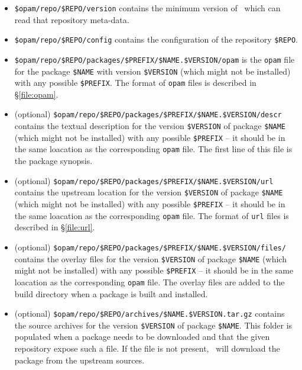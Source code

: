 \documentclass[a4paper,10pt]{article}
\begin{document}
\begin{itemize}

\item \verb+$opam/repo/$REPO/version+ contains the minimum version of
  \OPAM\ which can read that repository meta-data.

\item \verb+$opam/repo/$REPO/config+ contains the configuration
  of the repository \verb+$REPO+.

\item \verb+$opam/repo/$REPO/packages/$PREFIX/$NAME.$VERSION/opam+ is
  the {\tt opam} file for the package \verb+$NAME+ with version
  \verb+$VERSION+ (which might not be installed) with any possible
  \verb+$PREFIX+. The format of {\tt opam} files is described in
  \S\ref{file:opam}.

\item (optional) \verb+$opam/repo/$REPO/packages/$PREFIX/$NAME.$VERSION/descr+
  contains the textual description for the version \verb+$VERSION+ of
  package \verb+$NAME+ (which might not be installed) with any
  possible \verb+$PREFIX+ -- it should be in the same loacation as the
  corresponding {\tt opam} file. The first line of this file is the
  package synopsis.

\item (optional) \verb+$opam/repo/$REPO/packages/$PREFIX/$NAME.$VERSION/url+
  contains the upstream location for the version \verb+$VERSION+ of
  package \verb+$NAME+ (which might not be installed) with any
  possible \verb+$PREFIX+ -- it should be in the same loacation as the
  corresponding {\tt opam} file. The format of {\tt url} files is
  described in \S\ref{file:url}.

\item (optional) \verb+$opam/repo/$REPO/packages/$PREFIX/$NAME.$VERSION/files/+
  contains the overlay files for the version \verb+$VERSION+ of
  package \verb+$NAME+ (which might not be installed) with any
  possible \verb+$PREFIX+ -- it should be in the same loacation as the
  corresponding {\tt opam} file. The overlay files are added to the
  build directory when a package is built and installed.

\item (optional)
  \verb+$opam/repo/$REPO/archives/$NAME.$VERSION.tar.gz+ contains the
  source archives for the version \verb+$VERSION+ of package
  \verb+$NAME+. This folder is populated when a package needs to be
  downloaded and that the given repository expose such a file. If the
  file is not present, \OPAM\ will download the package from the
  upstream sources.

\end{itemize}
\end{document}
